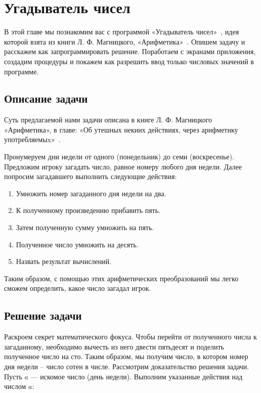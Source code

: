 \chapter{Угадыватель чисел}
\label{ch:guessnumbers}

В этой главе мы познакомим вас с программой «Угадыватель чисел»~\cite{PanfilovaApp}, идея которой взята из книги Л. Ф. Магницкого, «Арифметика»~\cite{Galanin}. 
Опишем задачу и расскажем как запрограммировать решение. Поработаем с экранами приложения, создадим процедуры и покажем как разрешить ввод только числовых значений в программе.


\section{Описание задачи}

Суть предлагаемой нами задачи описана в книге Л. Ф. Магницкого «Арифметика», в главе: «Об утешных некиих действиях, через арифметику употребляемыx»~\cite{Galanin}.

Пронумеруем дни недели от одного (понедельник) до семи (воскресенье). 
Предложим игроку загадать число, равное номеру любого дня недели. Далее попросим загадавшего выполнить следующие действия:
\begin{enumerate}
\item Умножить номер загаданного дня недели на два.
\item К полученному произведению прибавить пять.
\item Затем полученную сумму умножить на пять.
\item Полученное число умножить на десять.
\item Назвать результат вычислений.
\end{enumerate}

Таким образом, с помощью этих арифметических преобразований мы легко сможем определить, какое число загадал игрок.

\section{Решение задачи}

Раскроем секрет математического фокуса. Чтобы перейти от полученного числа к загаданному, необходимо вычесть из него двести пятьдесят и поделить полученное число на сто. Таким образом, мы получим число, в котором номер дня недели – число сотен в числе. Рассмотрим доказательство решения задачи. Пусть $ a $ — искомое число (день недели). Выполним указанные действия над числом $ a $:

